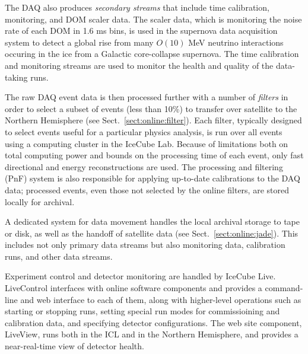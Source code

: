 The DAQ also produces \emph{secondary streams} that include time
calibration, monitoring, and DOM scaler data.  The scaler data, which is
monitoring the noise rate of each DOM in 1.6 ms bins, is used in the
supernova data acquisition system \cite{sndaq} to detect a global rise from
many $O(10)$ MeV neutrino interactions occuring in the ice from a
Galactic core-collapse supernova.  The time calibration and monitoring
streams are used to monitor the health and quality of the data-taking runs.

The raw DAQ event data is then processed further with a number of
\emph{filters} in order to select a subset of events (less than 10\%) to
transfer over satellite to the Northern Hemisphere (see
Sect.~\ref{sect:online:filter}).  Each
filter, typically designed to select events useful for a particular physics
analysis, is run
over all events using a computing cluster in the IceCube Lab.  Because of
limitations both on total computing power and bounds on the processing time
of each event, only fast directional and energy reconstructions are used.
The processing and filtering (PnF) system is also responsible for applying
up-to-date calibrations to the DAQ data; processed events, even those not
selected by the online filters, are stored locally for archival.

A dedicated system for data movement handles the local archival storage to
tape or disk, as well as the handoff of satellite data (see Sect.~\ref{sect:online:jade}).
This includes not only primary data streams but also monitoring data,
calibration runs, and other data streams.

Experiment control and detector monitoring are handled by IceCube Live.
LiveControl interfaces with online software components and provides a
command-line and web interface to each of them, along with higher-level
operations such as starting or stopping runs, setting special run modes for
commissioining and calibration data, and specifying detector
configurations.  The web site component, LiveView, runs both in the ICL and
in the Northern Hemisphere, and provides a near-real-time view of detector
health.  



